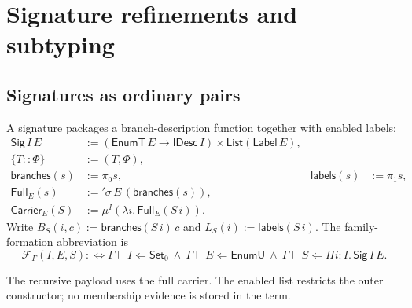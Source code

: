\documentclass[11pt,a4paper]{article}
\newcommand{\Set}{\mathsf{Set}}
\newcommand{\sy}[3]{#1\vdash #2\Rightarrow #3}
\newcommand{\chk}[3]{#1\vdash #2\Leftarrow #3}
\newcommand{\op}[1]{\mathsf{#1}}
\newcommand{\interp}[2]{\llbracket #1\rrbracket\,#2}
\newcommand{\ruleof}[3]{\inferrule*[right=\textsc{#1}]{#2}{#3}}
\theoremstyle{definition}\newtheorem{definition}[theorem]{Definition}
\begin{document}
\section{Signature refinements and subtyping}
\subsection{Signatures as ordinary pairs}
A signature packages a branch-description function together with enabled labels:
\begin{align*}
\op{Sig}\,I\,E&:=(\op{EnumT}\,E\to\op{IDesc}\,I)\times\op{List}(\op{Label}\,E),\\
\{T::\Phi\}&:=(T,\Phi),\\
\op{branches}(s)&:=\pi_0s, &\op{labels}(s)&:=\pi_1s,\\
\op{Full}_E(s)&:='\sigma\,E\,(\op{branches}(s)),\\
\op{Carrier}_E(S)&:=\mu^I(\lambda i.\,\op{Full}_E(S\,i)).
\end{align*}
Write $B_S(i,c):=\op{branches}(S\,i)\,c$ and $L_S(i):=\op{labels}(S\,i)$. The family-formation abbreviation is
\[
\mathcal F_\Gamma(I,E,S):\!\iff
\chk{\Gamma}{I}{\Set_0}\ \land\ \chk{\Gamma}{E}{\op{EnumU}}\ \land\
\chk{\Gamma}{S}{\Pi i:I.\,\op{Sig}\,I\,E}.
\]
The recursive payload uses the full carrier. The enabled list restricts the outer constructor; no membership evidence is stored in the term.
\end{document}
